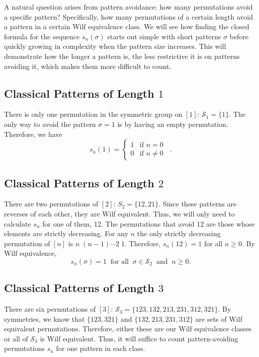 \documentclass[12pt]{article}
\newcommand{\sym}{\mathcal S}
\begin{document}
A natural question arises from pattern avoidance: how many permutations avoid a specific pattern? Specifically, how many permutations of a certain length avoid a pattern in a certain Wilf equivalence class. We will see how finding the closed formula for the sequence $s_n(\sigma)$ starts out simple with short patterns $\sigma$ before quickly growing in complexity when the pattern size increases. This will demonstrate how the longer a pattern is, the less restrictive it is on patterns avoiding it, which makes them more difficult to count.

\subsection{Classical Patterns of Length $1$}
There is only one permutation in the symmetric group on $[1]$: $\sym_1=\{1\}$. The only way to avoid the pattern $\sigma=1$ is by having an empty permutation. Therefore, we have $$s_n(1)=\begin{cases} 
  1 & \text{if } n=0 \\
  0   & \text{if } n\neq0 
\end{cases}\;\;.$$

\subsection{Classical Patterns of Length $2$}
There are two permutations of $[2]$: $S_2=\{12,21\}$. Since these patterns are reverses of each other, they are Wilf equivalent. Thus, we will only need to calculate $s_n$ for one of them, 12. The permutations that avoid 12 are those whose elements are strictly decreasing. For any $n$ the only strictly decreasing permutation of $[n]$ is $n\;(n-1)\cdots2\;1$. Therefore, $s_n(12)=1$ for all $n\geq0$.
By Wilf equivalence, $$s_n(\sigma)=1\;\;\text{for all}\;\;\sigma\in\sym_2\;\;\text{and}\;\;n\geq0.$$

\subsection{Classical Patterns of Length $3$}

There are six permutations of $[3]$: $\sym_3=\{123,132,213,231,312,321\}$. By symmetries, we know that $\{123,321\}$ and $\{132,213,231,312\}$ are sets of Wilf equivalent permutations. Therefore, either these are our Wilf equivalence classes or all of $\sym_3$ is Wilf equivalent. Thus, it will suffice to count pattern-avoiding permutations $s_n$ for one pattern in each class.
\end{document}
